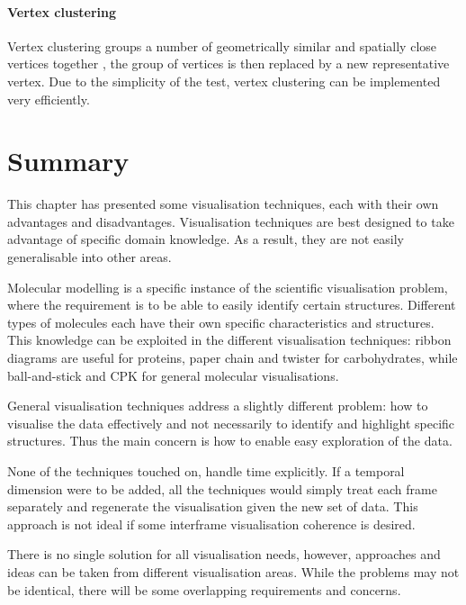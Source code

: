 
\paragraph{Vertex clustering}

Vertex clustering groups a number of geometrically similar and spatially close
vertices together \citep{rossignac93}, the group of vertices is then replaced
by a new representative vertex. Due to the simplicity of the test, vertex
clustering can be implemented very efficiently.



\section{Summary}
\label{sec:background_summary}

This chapter has presented some visualisation techniques, each with their own
advantages and disadvantages. Visualisation techniques are best designed to
take advantage of specific domain knowledge. As a result, they are not easily
generalisable into other areas.

Molecular modelling is a specific instance of the scientific visualisation
problem, where the requirement is to be able to easily identify certain
structures. Different types of molecules each have their own specific
characteristics and structures. This knowledge can be exploited in the
different visualisation techniques: ribbon diagrams are useful for proteins,
paper chain and twister for carbohydrates, while ball-and-stick and CPK for
general molecular visualisations.

General visualisation techniques address a slightly different problem: how to
visualise the data effectively and not necessarily to identify and highlight
specific structures. Thus the main concern is how to enable easy exploration of
the data.

None of the techniques touched on, handle time explicitly. If a temporal
dimension were to be added, all the techniques would simply treat each frame
separately and regenerate the visualisation given the new set of data. This
approach is not ideal if some interframe visualisation coherence is desired.

There is no single solution for all visualisation needs, however, approaches and
ideas can be taken from different visualisation areas. While the problems may
not be identical, there will be some overlapping requirements and concerns.



